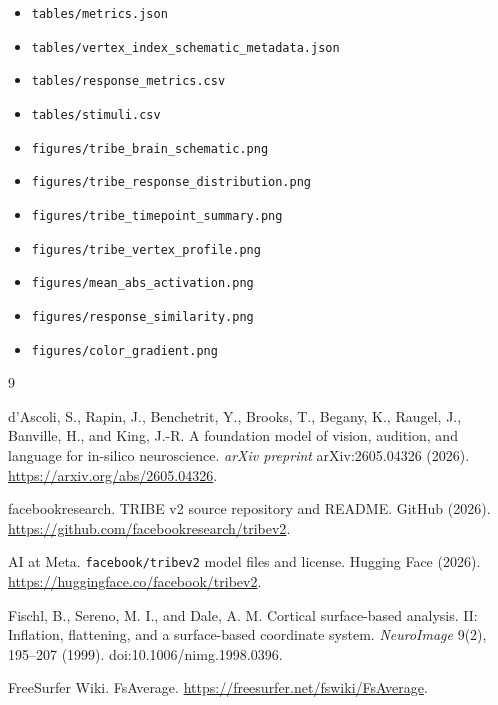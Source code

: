 \documentclass[11pt]{article}
\newcommand{\tribe}{TRIBE v2}
\begin{document}
\begin{itemize}
  \item \texttt{tables/metrics.json}
  \item \texttt{tables/vertex\_index\_schematic\_metadata.json}
  \item \texttt{tables/response\_metrics.csv}
  \item \texttt{tables/stimuli.csv}
  \item \texttt{figures/tribe\_brain\_schematic.png}
  \item \texttt{figures/tribe\_response\_distribution.png}
  \item \texttt{figures/tribe\_timepoint\_summary.png}
  \item \texttt{figures/tribe\_vertex\_profile.png}
  \item \texttt{figures/mean\_abs\_activation.png}
  \item \texttt{figures/response\_similarity.png}
  \item \texttt{figures/color\_gradient.png}
\end{itemize}

\begin{thebibliography}{9}
\raggedright

d'Ascoli, S., Rapin, J., Benchetrit, Y., Brooks, T., Begany, K., Raugel, J.,
Banville, H., and King, J.-R. A foundation model of vision, audition, and
language for in-silico neuroscience. \emph{arXiv preprint}
arXiv:2605.04326 (2026). \url{https://arxiv.org/abs/2605.04326}.

facebookresearch. \tribe{} source repository and README. GitHub (2026).
\url{https://github.com/facebookresearch/tribev2}.

AI at Meta. \texttt{facebook/tribev2} model files and license. Hugging Face
(2026). \url{https://huggingface.co/facebook/tribev2}.

Fischl, B., Sereno, M. I., and Dale, A. M. Cortical surface-based
analysis. II: Inflation, flattening, and a surface-based coordinate system.
\emph{NeuroImage} 9(2), 195--207 (1999). doi:10.1006/nimg.1998.0396.

FreeSurfer Wiki. FsAverage. \url{https://freesurfer.net/fswiki/FsAverage}.

\end{thebibliography}
\end{document}
